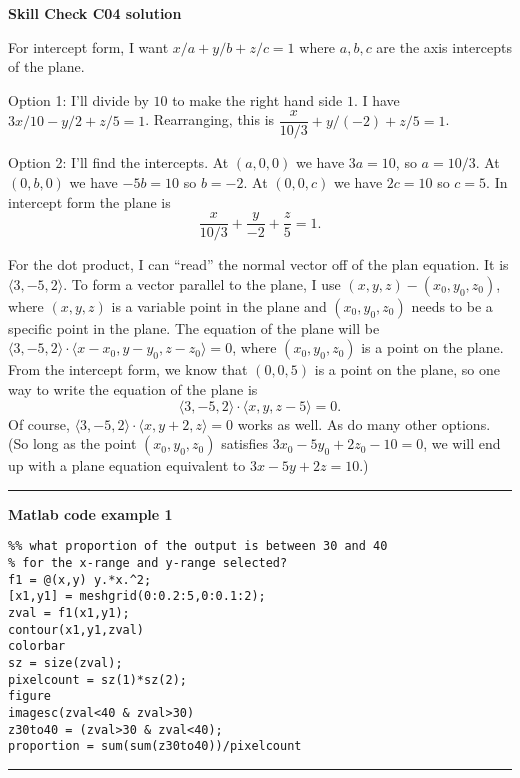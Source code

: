\documentclass[12pt,letterpaper,noanswers]{exam}
\begin{document}
\noindent\textbf{Skill Check C04 solution}

For intercept form, I want $x/a + y/b + z/c = 1$ where $a, b, c$ are the axis intercepts of the plane.

Option 1: I'll divide by $10$ to make the right hand side $1$.  I have $3x/10 - y/2 + z/5 = 1$.  Rearranging, this is $\dfrac{x}{10/3} + y/(-2) + z/5 = 1$.

Option 2: I'll find the intercepts.  At $(a,0,0)$ we have $3a = 10$, so $a = 10/3$.  At $(0,b,0)$ we have $-5b = 10$ so $b = -2$.  At $(0,0,c)$ we have $2c = 10$ so $c=5$.  In intercept form the plane is \[\frac{x}{10/3}+\frac{y}{-2}+\frac{z}{5} = 1.\]

For the dot product, I can ``read'' the normal vector off of the plan equation.  It is $\langle 3,-5,2\rangle$.  To form a vector parallel to the plane, I use $(x,y,z) - (x_0,y_0,z_0)$, where $(x,y,z)$ is a variable point in the plane and $(x_0,y_0,z_0)$ needs to be a specific point in the plane.  The equation of the plane will be $\langle 3,-5,2\rangle \cdot \langle x-x_0,y-y_0,z-z_0\rangle = 0$, where $(x_0,y_0,z_0)$ is a point on the plane.  From the intercept form, we know that $(0,0,5)$ is a point on the plane, so one way to write the equation of the plane is
\[\langle 3,-5,2\rangle \cdot \langle x,y,z-5\rangle = 0.\] Of course, 
$\langle 3,-5,2\rangle \cdot \langle x,y+2,z\rangle = 0$ works as well.  As do many other options.  (So long as the point $(x_0,y_0,z_0)$ satisfies $3x_0 - 5y_0 +2z_0 - 10 = 0$, we will end up with a plane equation equivalent to $3x-5y+2z=10$.)



\vspace{0.2cm}
\hrule
\vspace{0.2cm}

\eject

\noindent\textbf{Matlab code example 1}
\begin{lstlisting}
%% what proportion of the output is between 30 and 40
% for the x-range and y-range selected?
f1 = @(x,y) y.*x.^2;
[x1,y1] = meshgrid(0:0.2:5,0:0.1:2);
zval = f1(x1,y1);
contour(x1,y1,zval)
colorbar
sz = size(zval);
pixelcount = sz(1)*sz(2);
figure
imagesc(zval<40 & zval>30)
z30to40 = (zval>30 & zval<40);
proportion = sum(sum(z30to40))/pixelcount
\end{lstlisting}

\vspace{0.2cm}
\hrule
\vspace{0.2cm}
\end{document}
